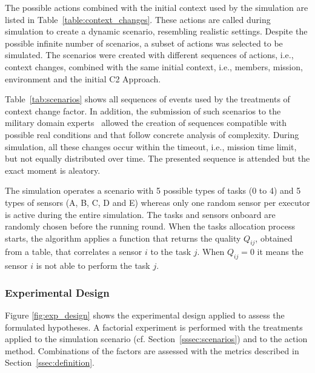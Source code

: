 The possible actions combined with the initial context used by the simulation are listed in Table~\ref{table:context_changes}. These actions are called during simulation to create a dynamic scenario, resembling realistic settings. Despite the possible infinite number of scenarios, a subset of actions was selected to be simulated. The scenarios were created with different sequences of actions, i.e., context changes, combined with the same initial context, i.e., members, mission, environment and the initial C2 Approach. 



Table~\ref{tab:scenarios} shows all sequences of events used by the treatments of context change factor. In addition, the submission of such scenarios to the military domain experts~\citep{nato01, doctrine01, Fernandes2016, UAV_Aplication, CC03, UAV01} allowed the creation of sequences compatible with possible real conditions and that follow concrete analysis of complexity. During simulation, all these changes occur within the timeout, i.e., mission time limit, but not equally distributed over time. The presented sequence is attended but the exact moment is aleatory.



The simulation operates a scenario with 5 possible types of tasks (0 to 4) and 5 types of sensors (A, B, C, D and E) whereas only one random sensor per executor is active during the entire simulation. The tasks and sensors onboard are randomly chosen before the running round. When the tasks allocation process starts, the algorithm applies a function that returns the quality $Q_{ij}$, obtained from a table, that correlates a sensor $i$ to the task $j$. When $Q_{ij}=0$ it means the sensor $i$ is not able to perform the task $j$.

\subsubsection{Experimental Design}
\label{sssec:design}


Figure \ref{fig:exp_design} shows the experimental design applied to assess the formulated hypotheses. A factorial experiment is performed with the treatments applied to the simulation scenario (cf. Section~\ref{sssec:scenarios}) and to the action method. Combinations of the factors are assessed with the metrics described in Section~\ref{ssec:definition}.

